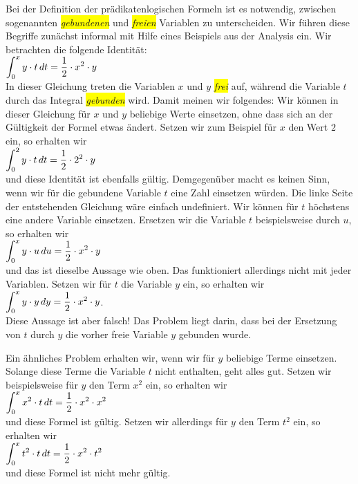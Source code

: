 \noindent
Bei der Definition der pr\"{a}dikatenlogischen Formeln ist es notwendig,
zwischen sogenannten \colorbox{yellow}{\emph{gebundenen}} und \colorbox{yellow}{\emph{freien}} Variablen zu unterscheiden.
Wir f\"{u}hren diese Begriffe zun\"{a}chst informal mit Hilfe eines Beispiels aus der Analysis ein.
Wir betrachten die folgende Identit\"{a}t: \\[0.2cm]
\hspace*{1.3cm}
 $\displaystyle\int_{0}^{x} y \cdot  t\, d t = \frac{1}{2} \cdot x^2 \cdot  y$ 
\\[0.2cm]
In dieser Gleichung treten die Variablen $x$ und $y$ \colorbox{yellow}{\emph{frei}} auf, w\"{a}hrend die Variable $t$ durch das Integral
\colorbox{yellow}{\emph{gebunden}} wird.  Damit meinen wir folgendes: Wir k\"{o}nnen in dieser Gleichung f\"{u}r $x$ und $y$ beliebige Werte
 einsetzen, ohne dass sich an der 
G\"{u}ltigkeit der Formel etwas \"{a}ndert.  Setzen wir zum Beispiel f\"{u}r $x$ den Wert $2$ ein, so erhalten wir \\[0.2cm]
\hspace*{1.3cm}
$\displaystyle\int_{0}^{2} y \cdot  t\, d t = \frac{1}{2} \cdot 2^2 \cdot  y$ \\[0.2cm]
und diese Identit\"{a}t ist ebenfalls g\"{u}ltig.  Demgegen\"{u}ber macht es keinen Sinn, wenn wir f\"{u}r die gebundene Variable
 $t$ eine Zahl einsetzen w\"{u}rden.
Die linke Seite der entstehenden Gleichung w\"{a}re einfach undefiniert.  Wir k\"{o}nnen f\"{u}r $t$
h\"{o}chstens eine andere Variable einsetzen. 
Ersetzen wir die Variable $t$ beispielsweise durch $u$, so erhalten wir \\[0.2cm]
\hspace*{1.3cm}
$\displaystyle\int_{0}^{x} y \cdot  u\, d u = \frac{1}{2} \cdot x^2 \cdot  y$ 
\\[0.2cm]
und das ist dieselbe Aussage wie oben.  Das funktioniert allerdings nicht mit jeder Variablen. Setzen wir
f\"{u}r $t$ die Variable $y$ ein, so erhalten wir \\[0.2cm]
\hspace*{1.3cm}
$\displaystyle\int_{0}^{x} y \cdot  y\, d y = \frac{1}{2} \cdot x^2 \cdot  y$. \\[0.2cm]
Diese Aussage ist aber falsch!  Das Problem liegt darin, dass bei der Ersetzung von $t$ durch $y$ die vorher freie Variable
$y$ gebunden wurde.  

Ein \"{a}hnliches Problem erhalten wir, wenn wir f\"{u}r $y$ beliebige Terme einsetzen.  Solange diese Terme die Variable $t$ 
nicht enthalten, geht alles gut.  Setzen wir beispielsweise f\"{u}r $y$  den Term $x^2$ ein, so erhalten
wir \\[0.2cm]
\hspace*{1.3cm}
$\displaystyle\int_{0}^{x} x^2 \cdot  t\, d t = \frac{1}{2} \cdot x^2 \cdot  x^2$ 
\\[0.2cm]
und diese Formel ist g\"{u}ltig.  Setzen wir allerdings f\"{u}r $y$ den Term $t^2$ ein, so erhalten wir \\[0.2cm]
\hspace*{1.3cm}
$\displaystyle\int_{0}^{x} t^2 \cdot  t\, d t = \frac{1}{2} \cdot x^2 \cdot  t^2$ 
\\[0.2cm]
und diese Formel ist nicht mehr g\"{u}ltig. 

